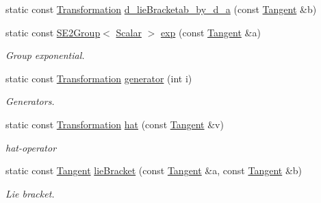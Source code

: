 \begin{DoxyCompactItemize}
\item 
static const \hyperlink{class_sophus_1_1_s_e2_group_base_a82fe531d4b64813525d4ebd131da9bcd}{Transformation} \hyperlink{class_sophus_1_1_s_e2_group_base_abd82580529a773695f83e6768c865c5c}{d\+\_\+lie\+Bracketab\+\_\+by\+\_\+d\+\_\+a} (const \hyperlink{class_sophus_1_1_s_e2_group_base_a71b41e6cde48514241c7bffcbe34923f}{Tangent} \&b)
\item 
static const \hyperlink{class_sophus_1_1_s_e2_group}{S\+E2\+Group}$<$ \hyperlink{class_sophus_1_1_s_e2_group_base_a1bad7970c24437df7f4a34281ff147fe}{Scalar} $>$ \hyperlink{class_sophus_1_1_s_e2_group_base_ade77e270e09a1719b56e765ee7c8967f}{exp} (const \hyperlink{class_sophus_1_1_s_e2_group_base_a71b41e6cde48514241c7bffcbe34923f}{Tangent} \&a)
\begin{DoxyCompactList}\small\item\em Group exponential. \end{DoxyCompactList}\item 
static const \hyperlink{class_sophus_1_1_s_e2_group_base_a82fe531d4b64813525d4ebd131da9bcd}{Transformation} \hyperlink{class_sophus_1_1_s_e2_group_base_a3d255ebf6a3101e2e79ae3dd97af6cbc}{generator} (int i)
\begin{DoxyCompactList}\small\item\em Generators. \end{DoxyCompactList}\item 
static const \hyperlink{class_sophus_1_1_s_e2_group_base_a82fe531d4b64813525d4ebd131da9bcd}{Transformation} \hyperlink{class_sophus_1_1_s_e2_group_base_aa5d381596ee614e1b32a36515c67287a}{hat} (const \hyperlink{class_sophus_1_1_s_e2_group_base_a71b41e6cde48514241c7bffcbe34923f}{Tangent} \&v)
\begin{DoxyCompactList}\small\item\em hat-\/operator \end{DoxyCompactList}\item 
static const \hyperlink{class_sophus_1_1_s_e2_group_base_a71b41e6cde48514241c7bffcbe34923f}{Tangent} \hyperlink{class_sophus_1_1_s_e2_group_base_ab3de14df064c6d609d1f3855edc065a8}{lie\+Bracket} (const \hyperlink{class_sophus_1_1_s_e2_group_base_a71b41e6cde48514241c7bffcbe34923f}{Tangent} \&a, const \hyperlink{class_sophus_1_1_s_e2_group_base_a71b41e6cde48514241c7bffcbe34923f}{Tangent} \&b)
\begin{DoxyCompactList}\small\item\em Lie bracket. \end{DoxyCompactList}\item 

\end{DoxyCompactItemize}
